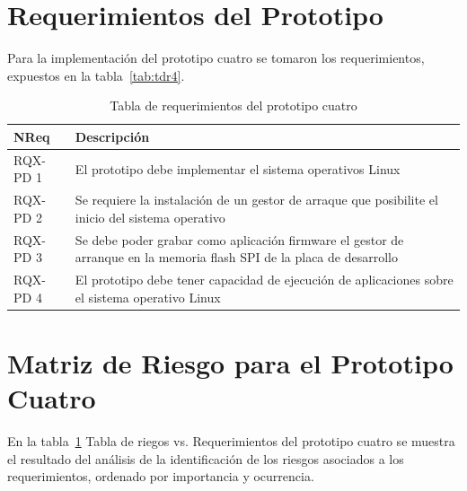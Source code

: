 		\section{Requerimientos del Prototipo}
Para la implementación del prototipo cuatro se tomaron los requerimientos, expuestos en la tabla~\ref{tab:tdr4}.		

		\begin{table}[h!]
		\centering	
		\begin{tabular}{ p{2.5cm} p{14.5cm} }
		\hline 
		\rowcolor[gray]{0.8} N\textordmasculine Req  & Descripción\\
		\hline                             	RQX-PD 1 & El prototipo debe implementar el sistema operativos Linux\\ 
		\hline  						RQX-PD 2 & Se requiere la instalación de un gestor de arraque que posibilite el inicio del sistema operativo\\ 
		\hline 						RQX-PD 3 & Se debe poder grabar como aplicación firmware el gestor de arranque en la memoria flash SPI de la placa de desarrollo\\
		\hline 						RQX-PD 4 & El prototipo debe tener capacidad de ejecución de aplicaciones sobre el sistema operativo Linux\\
		\hline 
		\end{tabular}
		\caption{Tabla de requerimientos del prototipo cuatro}
		\label{tab:riegos4}
		\end{table}
		
		\newpage
		\section{Matriz de Riesgo para el Prototipo Cuatro} 
En la tabla~\ref{tab:riegos4} Tabla de riegos vs. Requerimientos del prototipo cuatro se muestra el resultado del análisis de la identificación de los riesgos asociados a los requerimientos, ordenado por importancia y ocurrencia.

